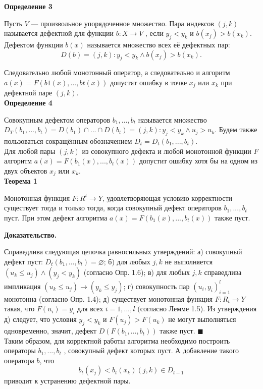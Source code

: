 \documentclass[a4paper,12pt]{article}
\begin{document}
\textbf{Определение 3} 

Пусть $V$ — произвольное упорядоченное множество. Пара индексов $(j, k)$
называется дефектной для функции $b : X \rightarrow V$ , если $y_j < y_k$ и $b(x_j ) > b(x_k)$. Дефектом функции $b(x)$ называется множество всех её дефектных пар:
\[D(b) = {(j, k): y_j < y_k \wedge b(x_j ) > b(x_k)} .\]


Следовательно любой монотонный оператор, а следовательно и алгоритм $a(x) = F(b1(x), . . . , bt(x)) $ допустят ошибку в точке $x_j$ или $x_k$ при дефектной паре $(j, k)$.
\\

\textbf{Определение 4} 

Совокупным дефектом операторов $b_1, . . . , b_t$ называется множество
$D_T (b_1, . . . , b_t) = D(b_1) \cap ... \cap D(b_t) = {(j, k): y_j < y_k \wedge u_j > u_k}.$
Будем также пользоваться сокращённым обозначением $D_t = D_t(b_1, . . . , b_t).$
\\
Для любой пары $(j, k)$ из совокупного дефекта и любой монотонной функции $F$ алгоритм $a(x) = F(b_1(x), . . . , b_t(x)) $ допустит ошибку хотя бы на одном из двух объектов $x_j$ или $x_k$.\\

\textbf{
Теорема 1} 

 Монотонная функция $F : R^t \rightarrow Y $, удовлетворяющая условию корректности существует тогда и только тогда, когда совокупный дефект операторов $b_1, . . . , b_t$ пуст. При этом дефект алгоритма $a(x) = F(b_1(x), . . . , b_t(x)) $ также пуст.


\textbf{Доказательство.}

Справедлива следующая цепочка равносильных утверждений:
а) совокупный дефект пуст: $D_t(b_1, . . . , b_t) = \varnothing$;
б) для любых $j, k$ не выполняется $(u_k \leq u_j ) \wedge (y_j < y_k)$ (согласно Опр. 1.6);
в) для любых $j, k$ справедлива импликация $(u_k \leq u_j ) \rightarrow (y_k \leq y_j )$;
г) совокупность пар $(u_i, y_i)^l_{i=1}$ монотонна (согласно Опр. 1.4);
д) существует монотонная функция $F : R_t \rightarrow Y$ такая, что $F(u_i) = y_i$ для всех
$i = 1, . . . , l$ (согласно Лемме 1.5).
Из утверждения д) следует, что условия $y_j < y_k$ и $F(u_j ) > F(u_k)$ не могут
выполняться одновременно, значит, дефект $D(F(b_1, . . . , b_t))$ также пуст. $\blacksquare$\\


Таким образом, для корректной работы алгоритма необходимо построить операторы $ b_1, . . . , b_t$
, совокупный дефект которых пуст. А добавление такого оператора $b$, что 
\begin{equation}\label{iter}
b_t (x_j) < b_t(x_k) (j, k) \in D_{t-1}
\end{equation}
приводит к устранению дефектной пары.\\
\end{document}
